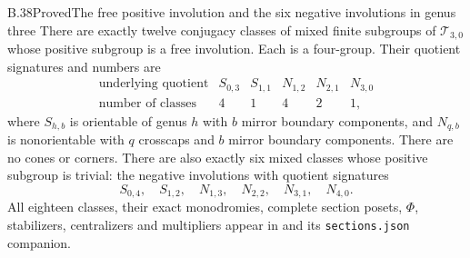\begin{claim}{B.38}{Proved}{The free positive involution and the six negative involutions in genus three}
There are exactly twelve conjugacy classes of mixed finite subgroups
of $\mathcal T_{3,0}$ whose positive subgroup is a free involution.
Each is a four-group.  Their quotient signatures and numbers are
\[
\begin{array}{c|ccccc}
\text{underlying quotient}&S_{0,3}&S_{1,1}&N_{1,2}&N_{2,1}&N_{3,0}\\\hline
\text{number of classes}&4&1&4&2&1 ,
\end{array}                                             \tag{B.38.1}
\]
where $S_{h,b}$ is orientable of genus $h$ with $b$ mirror boundary
components, and $N_{q,b}$ is nonorientable with $q$ crosscaps and
$b$ mirror boundary components.  There are no cones or corners.
There are also exactly six mixed classes whose positive subgroup
is trivial: the negative involutions with quotient signatures
\[
 S_{0,4},\quad S_{1,2},\quad
 N_{1,3},\quad N_{2,2},\quad N_{3,1},\quad N_{4,0}.
                                                        \tag{B.38.2}
\]
All eighteen classes, their exact monodromies, complete section
posets, $\Phi$, stabilizers, centralizers and multipliers appear in
and its \texttt{sections.json} companion.
\end{claim}

